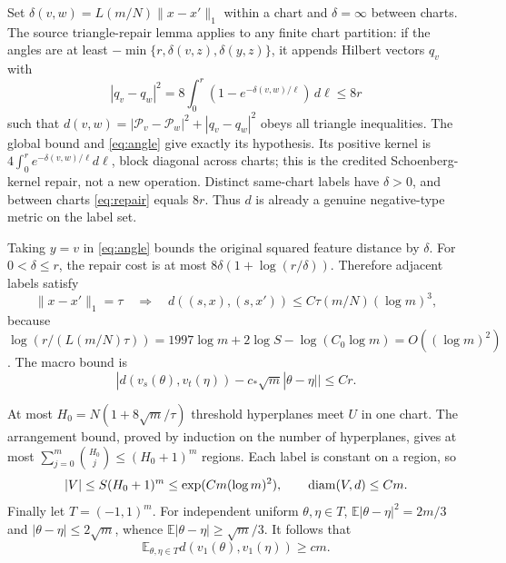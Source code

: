 \documentclass[11pt]{article}
\theoremstyle{remark}\newtheorem{remark}[theorem]{Remark}
\numberwithin{equation}{section}
\newcommand{\E}{\mathbb E}\newcommand{\Prob}{\mathbb P}
\newcommand{\norm}[1]{\lVert #1\rVert}
\begin{document}
Set $\delta(v,w)=L(m/N)\norm{x-x'}_1$ within a chart and $\delta=\infty$
between charts. The source triangle-repair lemma applies to any finite
chart partition: if the angles are at least
$-\min\{r,\delta(v,z),\delta(y,z)\}$, it appends Hilbert vectors $q_v$
with
\begin{equation}\label{eq:repair}
 |q_v-q_w|^2=8\int_0^r(1-e^{-\delta(v,w)/\ell})\,d\ell\le8r
\end{equation}
such that $d(v,w)=|\mathcal P_v-\mathcal P_w|^2+|q_v-q_w|^2$ obeys
all triangle inequalities. The global bound and \eqref{eq:angle} give
exactly its hypothesis. Its positive kernel is
$4\int_0^r e^{-\delta(v,w)/\ell}d\ell$, block diagonal across charts;
this is the credited Schoenberg-kernel repair, not a new operation.
Distinct same-chart labels have $\delta>0$, and between charts
\eqref{eq:repair} equals $8r$. Thus $d$ is already a genuine negative-type
metric on the label set.

Taking $y=v$ in \eqref{eq:angle} bounds the original squared feature
distance by $\delta$. For $0<\delta\le r$, the repair cost is at most
$8\delta(1+\log(r/\delta))$. Therefore adjacent labels satisfy
\begin{equation}\label{eq:adjacent}
 \norm{x-x'}_1=\tau\quad\Longrightarrow\quad
 d((s,x),(s,x'))\le C\tau(m/N)(\log m)^3,
\end{equation}
because
$\log(r/(L(m/N)\tau))=1997\log m+2\log S-\log(C_0\log m)
=O((\log m)^2)$. The macro bound is
\begin{equation}\label{eq:macro}
 |d(v_s(\theta),v_t(\eta))-c_*\sqrt m|\theta-\eta||\le Cr.
\end{equation}

At most $H_0=N(1+8\sqrt m/\tau)$ threshold hyperplanes meet $U$ in one
chart. The arrangement bound, proved by induction on the number of
hyperplanes, gives at most $\sum_{j=0}^m\binom{H_0}j\le(H_0+1)^m$
regions. Each label is constant on a region, so
\begin{equation}\label{eq:size}
 |V|\le S(H_0+1)^m\le\exp(Cm(\log m)^2),\qquad \operatorname{diam}(V,d)\le Cm.
\end{equation}
Finally let $T=(-1,1)^m$. For independent uniform $\theta,\eta\in T$,
$\E|\theta-\eta|^2=2m/3$ and $|\theta-\eta|\le2\sqrt m$, whence
$\E|\theta-\eta|\ge\sqrt m/3$. It follows that
\begin{equation}\label{eq:macroaverage}
 \E_{\theta,\eta\in T}d(v_1(\theta),v_1(\eta))\ge cm.
\end{equation}
\end{document}
